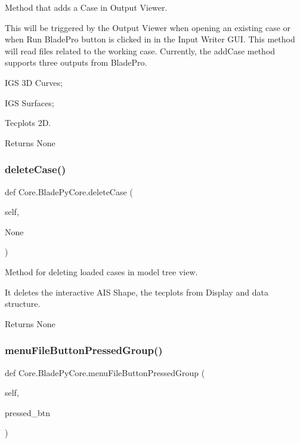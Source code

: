 Method that adds a Case in Output Viewer. 

This will be triggered by the Output Viewer when opening an existing case or when Run Blade\+Pro button is clicked in in the Input Writer G\+UI. This method will read files related to the working case. Currently, the add\+Case method supports three outputs from Blade\+Pro.

\begin{DoxyItemize}
\item I\+GS 3D Curves; \item I\+GS Surfaces; \item Tecplots 2D.\end{DoxyItemize}
\begin{DoxyReturn}{Returns}
None 
\end{DoxyReturn}
\hypertarget{a00079_a305ea5ff4997029c7a54a4550a23eba8}{}\label{a00079_a305ea5ff4997029c7a54a4550a23eba8} 
\subsubsection{\texorpdfstring{delete\+Case()}{deleteCase()}}
{\footnotesize\ttfamily def Core.\+Blade\+Py\+Core.\+delete\+Case (\begin{DoxyParamCaption}\item[{}]{self,  }\item[{}]{None }\end{DoxyParamCaption})}



Method for deleting loaded cases in model tree view. 

It deletes the interactive A\+IS Shape, the tecplots from Display and data structure.

\begin{DoxyReturn}{Returns}
None 
\end{DoxyReturn}
\hypertarget{a00079_aedcbcf23c32b9661d48f28e11c0c7172}{}\label{a00079_aedcbcf23c32b9661d48f28e11c0c7172} 
\subsubsection{\texorpdfstring{menu\+File\+Button\+Pressed\+Group()}{menuFileButtonPressedGroup()}}
{\footnotesize\ttfamily def Core.\+Blade\+Py\+Core.\+menu\+File\+Button\+Pressed\+Group (\begin{DoxyParamCaption}\item[{}]{self,  }\item[{}]{pressed\+\_\+btn }\end{DoxyParamCaption})}



